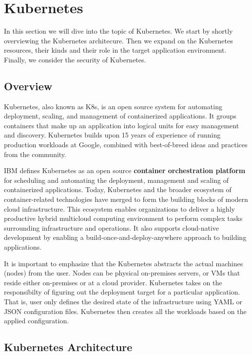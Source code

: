\section{Kubernetes}

In this section we will dive into the topic of Kubernetes. We start by shortly overviewing the Kubernetes architecure. Then we expand on the Kubernetes resources, their kinds and their role in the target application environment. Finally, we consider the security of Kubernetes.

\subsection{Overview}

Kubernetes, also known as K8s, is an open source system for automating deployment, scaling, and management of containerized applications. It groups containers that make up an application into logical units for easy management and discovery. Kubernetes builds upon 15 years of experience of running production workloads at Google, combined with best-of-breed ideas and practices from the community. \cite{kubernetes}

IBM defines Kubernetes as an open source \textbf{container orchestration platform} for scheduling and automating the deployment, management and scaling of containerized applications. Today, Kubernetes and the broader ecosystem of container-related technologies have merged to form the building blocks of modern cloud infrastructure. This ecosystem enables organizations to deliver a highly productive hybrid multicloud computing environment to perform complex tasks surrounding infrastructure and operations. It also supports cloud-native development by enabling a build-once-and-deploy-anywhere approach to building applications. \cite{ibm-kubernetes}

It is important to emphasize that the Kubernetes abstracts the actual machines (nodes) from the user. Nodes can be physical on-premises servers, or VMs that reside either on-premises or at a cloud provider. Kubernetes takes on the responsibilty of figuring out the deployment target for a particular application. That is, user only defines the desired state of the infrastructure using YAML or JSON configuration files. Kubernetes then creates all the workloads based on the applied configuration.

\subsection{Kubernetes Architecture}

